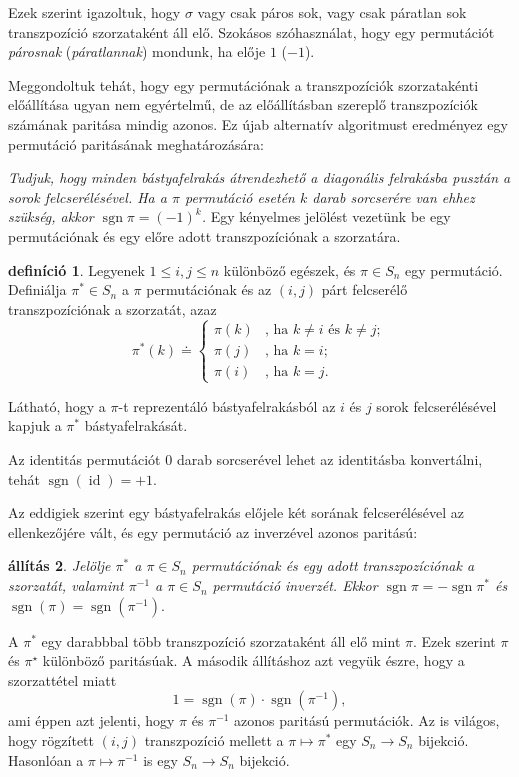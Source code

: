 \documentclass[a4paper, showtrims]{memoir}
\makeatletter
\renewenvironment{proof}[1][\proofname]
    {\par\pushQED{\qed}%
    \normalfont \topsep6\p@\@plus6\p@\relax
    \trivlist
    \item[\hskip\labelsep
        \itshape
    #1\@addpunct{:}]\ignorespaces}
    {\popQED\endtrivlist\@endpefalse}
\theoremstyle{plain}
\newtheorem{proposition}{állítás}[chapter]
\theoremstyle{remark}
\theoremstyle{definition}
\newtheorem{definition}[proposition]{definíció}
\DeclareMathOperator{\sgn}{sgn}
\DeclareMathOperator{\id}{id}
\makeatother
\begin{document}
    Ezek szerint igazoltuk, hogy $\sigma$ vagy csak páros sok, vagy csak páratlan sok transzpozíció szorzataként áll elő. Szokásos szóhasználat, hogy egy permutációt \emph{párosnak} (\emph{páratlannak}) mondunk,
    ha elője $1$ ($-1$).

    Meggondoltuk tehát, hogy egy permutációnak
    a transzpozíciók szorzatakénti előállítása ugyan nem egyértelmű,
    de az előállításban szereplő transzpozíciók számának paritása mindig azonos.
    Ez újab  alternatív algoritmust eredményez egy permutáció paritásának meghatározására:

    \emph{%
    	Tudjuk, hogy minden bástyafelrakás átrendezhető a diagonális felrakásba pusztán a sorok felcserélésével.
    	Ha a $\pi$ permutáció esetén $k$ darab sorcserére van ehhez szükség,
    	akkor $\sgn \pi=\left( -1 \right)^k$.
    }
Egy kényelmes jelölést vezetünk be egy permutációnak és egy előre adott transzpozíciónak a szorzatára.
\begin{definition}
	Legyenek $1\leq i,j\leq n$ különböző egészek,
	és $\pi \in S_{n}$ egy permutáció.
	Definiálja $\pi ^{\ast }\in S_{n}$ a $\pi$ permutációnak és az $\left( i,j \right)$ párt felcserélő transzpozíciónak a szorzatát,
	azaz
	\[
		\pi ^{\ast }\left( k\right) \doteq \left\{
		\begin{array}{ll}
			\pi \left( k\right) &
			\text{, ha }k\neq i\text{ és }k\neq j; \\
			\pi \left( j\right) & \text{, ha }k=i; \\
			\pi \left( i\right) & \text{, ha }k=j.
		\end{array}
		\right.
	\]
\end{definition}
Látható,
hogy a $\pi$-t reprezentáló bástyafelrakásból az $i$ és $j$ sorok felcserélésével kapjuk a $\pi^{\ast}$ bástyafelrakását.

Az identitás permutációt $0$ darab sorcserével lehet az identitásba konvertálni,
tehát $\sgn(\id)=+1$.

Az eddigiek szerint egy bástyafelrakás előjele két sorának felcserélésével az ellenkezőjére vált, és 
egy permutáció az inverzével azonos paritású:
\begin{proposition}
        Jelölje $\pi^\ast$ a $\pi\in S_n$ permutációnak és egy adott transzpozíciónak a szorzatát,
        valamint $\pi^{-1}$ a $\pi\in S_n$ permutáció inverzét.
        	Ekkor
            \(\sgn \pi=-\sgn\pi^\ast
        	\)
            és
            \(
            	\sgn\left( \pi \right)=\sgn\left( \pi^{-1} \right).
            \)
\end{proposition}
\begin{proof}
    A $\pi^{\ast}$ egy darabbbal több transzpozíció szorzataként áll elő mint $\pi$.
    Ezek szerint $\pi$ és $\pi^\star$ különböző paritásúak.
    A második állításhoz azt vegyük észre, hogy a szorzattétel miatt
    \[
        1=\sgn\left( \pi \right)\cdot\sgn\left( \pi^{-1} \right),
    \]
    ami éppen azt jelenti, hogy $\pi$ és $\pi^{-1}$ azonos paritású permutációk.
\end{proof}
Az is világos, 
hogy rögzített $\left( i,j \right)$ transzpozíció mellett 
a $\pi\mapsto\pi^\ast$ egy $S_n\to S_n$ bijekció.
Hasonlóan 
a $\pi\mapsto\pi^{-1}$ is egy $S_n\to S_n$ bijekció.
\end{document}
